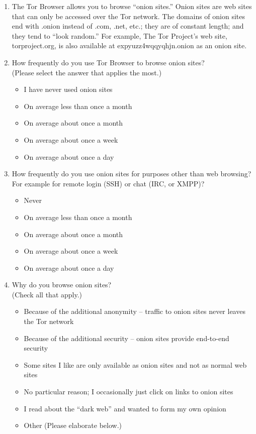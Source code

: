 \begin{enumerate}
    \item The Tor Browser allows you to browse ``onion sites.'' Onion sites are
        web sites that can only be accessed over the Tor network. The domains
        of onion sites end with .onion instead of .com, .net, etc.; they are of
        constant length; and they tend to ``look random.'' For example, The Tor
        Project’s web site, torproject.org, is also available at
        expyuzz4wqqyqhjn.onion as an onion site.

    \item How frequently do you use Tor Browser to browse onion sites?\\(Please
        select the answer that applies the most.)
        \begin{itemize}[label=$\Circle$]
            \item I have never used onion sites
            \item On average less than once a month
            \item On average about once a month
            \item On average about once a week
            \item On average about once a day
        \end{itemize}

    \item How frequently do you use onion sites for purposes other than web
        browsing? For example for remote login (SSH) or chat (IRC, or XMPP)?
        \begin{itemize}[label=$\Circle$]
            \item Never
            \item On average less than once a month
            \item On average about once a month
            \item On average about once a week
            \item On average about once a day
        \end{itemize}

    \item Why do you browse onion sites?\\(Check all that apply.)
        \begin{itemize}[label=$\Square$]
            \item Because of the additional anonymity -- traffic to onion sites
                never leaves the Tor network
            \item Because of the additional security -- onion sites provide
                end-to-end security
            \item Some sites I like are only available as onion sites and not
                as normal web sites
            \item No particular reason; I occasionally just click on links to
                onion sites
            \item I read about the ``dark web'' and wanted to form my own
                opinion
            \item Other (Please elaborate below.)
        \end{itemize}


\end{enumerate}
